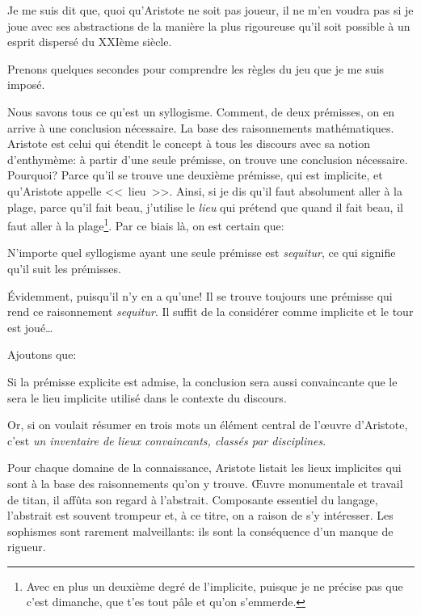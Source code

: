 Je me suis dit que, quoi qu'Aristote ne soit pas joueur, il ne m'en voudra pas si je joue avec ses abstractions de la
manière la plus rigoureuse qu'il soit possible à un esprit dispersé du XXIème siècle.

Prenons quelques secondes pour comprendre les règles du jeu que je me suis imposé.

Nous savons tous ce qu'est un syllogisme. Comment, de deux prémisses, on en arrive à une conclusion nécessaire.
La base des raisonnements mathématiques. Aristote est celui qui étendit le concept à tous les discours avec sa
notion d'enthymème: à partir d'une seule prémisse, on trouve une conclusion nécessaire. Pourquoi? Parce qu'il
se trouve une deuxième prémisse, qui est implicite, et qu'Aristote appelle <<~lieu~>>. Ainsi, si je dis qu'il faut
absolument aller à la plage, parce qu'il fait beau, j'utilise le \emph{lieu} qui prétend que quand il fait beau,
il faut aller à la plage\footnote{Avec en plus un deuxième degré de l'implicite, puisque je ne précise pas que c'est
dimanche, que t'es tout pâle et qu'on s'emmerde.}. Par ce biais là, on est certain que:

\begin{emphpar}
	N'importe quel syllogisme ayant une seule prémisse est \emph{sequitur}, ce qui signifie qu'il suit les
	prémisses.
\end{emphpar}

Évidemment, puisqu'il n'y en a qu'une! Il se trouve toujours une prémisse qui rend ce raisonnement \emph{sequitur}.
Il suffit de la considérer comme implicite et le tour est joué\dots{}

Ajoutons que:

\begin{emphpar}
	Si la prémisse explicite est admise, la conclusion sera aussi convaincante que le sera le lieu implicite utilisé
	dans le contexte du discours.
\end{emphpar}

Or, si on voulait résumer en trois mots un élément central de l’œuvre d'Aristote, c'est \emph{un inventaire de lieux
convaincants, classés par disciplines}.

Pour chaque domaine de la connaissance, Aristote listait les lieux implicites qui sont à la base des raisonnements
qu'on y trouve. Œuvre monumentale et travail de titan, il affûta son regard à l'abstrait. Composante essentiel du
langage, l'abstrait est souvent trompeur et, à ce titre, on a raison de s'y intéresser. Les sophismes sont rarement
malveillants: ils sont la conséquence d'un manque de rigueur.

